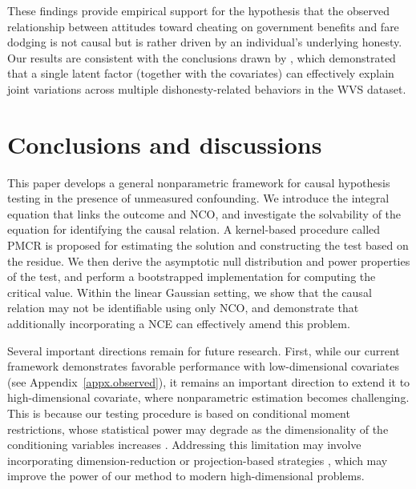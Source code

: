 \documentclass[
  12pt]{article}
\begin{document}
These findings provide empirical support for the hypothesis that the observed relationship between attitudes toward cheating on government benefits and fare dodging is not causal but is rather driven by an individual's underlying honesty. Our results are consistent with the conclusions drawn by \citet{ying2025generalized}, which demonstrated that a single latent factor (together with the covariates) can effectively explain joint variations across multiple dishonesty-related behaviors in the WVS dataset.




\section{Conclusions and discussions}\label{sec.con}

This paper develops a general nonparametric framework for causal hypothesis testing in the presence of unmeasured confounding. We introduce the integral equation that links the outcome and NCO, and investigate the solvability of the equation for identifying the causal relation. A kernel-based procedure called PMCR is proposed for estimating the solution and constructing the test based on the residue. We then derive the asymptotic null distribution and
power properties of the test, and perform a bootstrapped implementation for computing the critical value. Within the linear Gaussian setting, we show that the causal relation may not be identifiable using only NCO, and demonstrate that additionally incorporating a NCE can effectively amend this problem. %

Several important directions remain for future research. First, while our current framework demonstrates favorable performance with low-dimensional covariates (see Appendix~\ref{appx.observed}), it remains an important direction to extend it to high-dimensional covariate, where nonparametric estimation becomes challenging. This is because our testing procedure is based on conditional moment restrictions, whose statistical power may degrade as the dimensionality of the conditioning variables increases \citep{tan2022integrated}. Addressing this limitation may involve incorporating dimension-reduction \citep{stute2002model} or projection-based strategies \citep{lavergne2008breaking}, which may improve the power of our method to modern high-dimensional problems.
\end{document}
